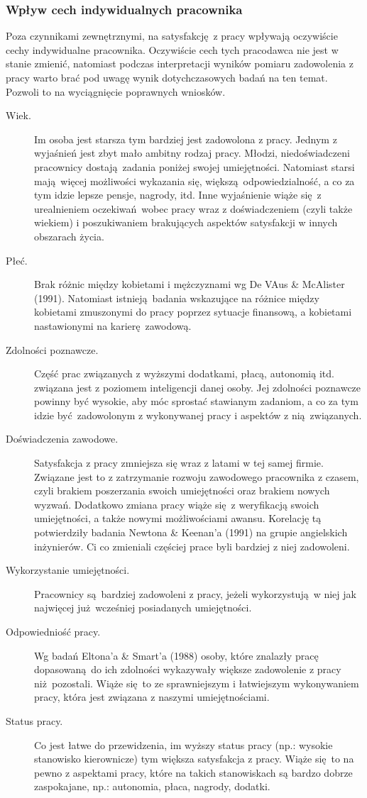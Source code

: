 \subsubsection{Wpływ cech indywidualnych pracownika}
Poza czynnikami zewnętrznymi, na satysfakcję z pracy wpływają oczywiście cechy indywidualne pracownika. Oczywiście cech tych pracodawca nie jest w stanie zmienić, natomiast podczas interpretacji wyników pomiaru zadowolenia z pracy warto brać pod uwagę wynik dotychczasowych badań na ten temat. Pozwoli to na wyciągnięcie poprawnych wniosków.

\begin{description}
\item[Wiek.] Im osoba jest starsza tym bardziej jest zadowolona z pracy. Jednym z wyjaśnień jest zbyt mało ambitny rodzaj pracy. Młodzi, niedoświadczeni pracownicy dostają zadania poniżej swojej umiejętności. Natomiast starsi mają więcej możliwości wykazania się, większą odpowiedzialność, a co za tym idzie lepsze pensje, nagrody, itd. Inne wyjaśnienie wiąże się z urealnieniem oczekiwań wobec pracy wraz z doświadczeniem (czyli
także wiekiem) i poszukiwaniem brakujących aspektów satysfakcji w innych obszarach życia.
\item[Płeć.] Brak różnic między kobietami i mężczyznami wg De VAus \& McAlister (1991). Natomiast istnieją badania wskazujące na różnice między kobietami zmuszonymi do pracy poprzez sytuacje finansową, a kobietami nastawionymi na karierę zawodową.
\item[Zdolności poznawcze.] Część prac związanych z wyższymi dodatkami, płacą, autonomią itd. związana jest z poziomem inteligencji danej osoby. Jej zdolności poznawcze powinny być wysokie, aby móc sprostać stawianym zadaniom, a co za tym idzie być zadowolonym z wykonywanej pracy i aspektów z nią związanych.
\item[Doświadczenia zawodowe.] Satysfakcja z pracy zmniejsza się wraz z latami w tej samej firmie. Związane jest to z zatrzymanie rozwoju zawodowego pracownika z czasem, czyli brakiem poszerzania swoich umiejętności oraz brakiem nowych wyzwań. Dodatkowo zmiana pracy wiąże się z weryfikacją swoich umiejętności, a także nowymi możliwościami awansu. Korelację tą potwierdziły badania Newtona \& Keenan'a (1991) na grupie angielskich inżynierów. Ci co zmieniali częściej prace byli bardziej z niej zadowoleni.
\item[Wykorzystanie umiejętności.] Pracownicy są bardziej zadowoleni z pracy, jeżeli wykorzystują w niej jak najwięcej już wcześniej posiadanych umiejętności.
\item[Odpowiedniość pracy.] Wg badań Eltona'a \& Smart'a (1988) osoby, które znalazły pracę dopasowaną do ich zdolności wykazywały większe zadowolenie z pracy niż pozostali. Wiąże się to ze sprawniejszym i łatwiejszym wykonywaniem pracy, która jest związana z naszymi umiejętnościami.
\item[Status pracy.] Co jest łatwe do przewidzenia, im wyższy status pracy (np.: wysokie stanowisko kierownicze) tym większa satysfakcja z pracy. Wiąże się to na pewno z aspektami pracy, które na takich stanowiskach są bardzo dobrze zaspokajane, np.: autonomia, płaca, nagrody, dodatki.
\end{description}
